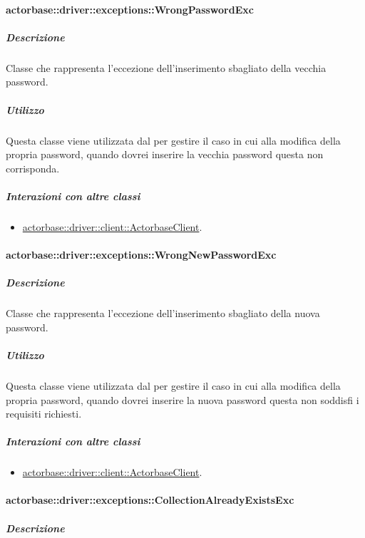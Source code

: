 \documentclass{scalatekids-article}
\begin{document}
\paragraph{actorbase::driver::exceptions::WrongPasswordExc}

\subparagraph{Descrizione}

Classe che rappresenta l'eccezione dell'inserimento sbagliato della vecchia password.

\subparagraph{Utilizzo}

Questa classe viene utilizzata dal  per gestire il caso in cui alla modifica della propria password, quando dovrei inserire la vecchia password questa non corrisponda.

\subparagraph{Interazioni con altre classi}

\begin{itemize}
\item \hyperref[sec:actorbase::driver::client::ActorbaseClient]{actorbase::driver::client::ActorbaseClient}.
\end{itemize}

\paragraph{actorbase::driver::exceptions::WrongNewPasswordExc}

\subparagraph{Descrizione}

Classe che rappresenta l'eccezione dell'inserimento sbagliato della nuova password.

\subparagraph{Utilizzo}

Questa classe viene utilizzata dal  per gestire il caso in cui alla modifica della propria password, quando dovrei inserire la nuova password questa non soddisfi i requisiti richiesti.

\subparagraph{Interazioni con altre classi}

\begin{itemize}
\item \hyperref[sec:actorbase::driver::client::ActorbaseClient]{actorbase::driver::client::ActorbaseClient}.
\end{itemize}

\paragraph{actorbase::driver::exceptions::CollectionAlreadyExistsExc}

\subparagraph{Descrizione}
\end{document}
